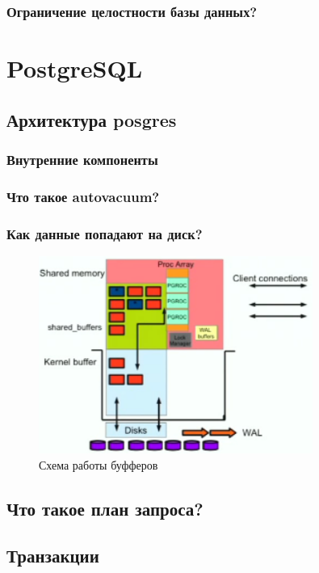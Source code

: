 \subsection{Ограничение целостности базы данных?}

\chapter{PostgreSQL}

\section{Архитектура posgres}
\subsection{Внутренние компоненты}
\subsection{Что такое autovacuum?}
\subsection{Как данные попадают на диск?}

\begin{figure}[h!]
\centering
\includegraphics[width=0.8\textwidth]{img/postgres-scheme-buffers.png}
\caption{Схема работы буфферов}
\label{postgres-buffers}
\end{figure}

\section{Что такое план запроса?}

\section{Транзакции}

